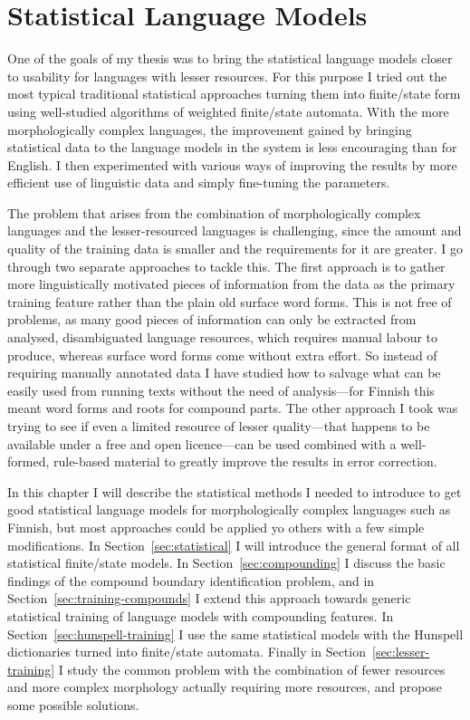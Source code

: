 \documentclass[officiallayout,final]{unihelcompling}
\begin{document}
\chapter{Statistical Language Models}
\label{chap:statistical-models}

One of the goals of my thesis was to bring the statistical \glspl{language
model} closer to usability for  languages with lesser resources. For this
purpose I tried out the most typical traditional statistical approaches turning
them into finite\-/state form using well-studied algorithms of weighted
finite\-/state automata. With the more morphologically complex languages, the
improvement gained by bringing statistical data to the language models in the
system is less encouraging than for English. I then experimented with various
ways of improving the results by more efficient use of linguistic data and
simply fine-tuning the parameters.

The problem that arises from the combination of morphologically complex
languages and the lesser-resourced languages is challenging, since the amount
and quality of the training data is smaller and the requirements for it are
greater. I go through two separate approaches to tackle this. The first
approach is to gather more linguistically motivated pieces of information from
the data as the primary training feature rather than the plain old surface
word forms. This is not free of problems, as many good pieces of information
can only be extracted from analysed, disambiguated language resources,
which requires manual labour to produce, whereas surface word forms
come without extra effort. So instead of requiring manually annotated data I
have studied how to salvage what can be easily used from running texts without
the need of analysis---for Finnish this meant word forms and roots for compound
parts. The other approach I took was trying to see if even a limited
resource of lesser quality---that happens to be available under a free and open
licence---can be used combined with a well-formed, rule-based material to
greatly improve the results in error correction.

In this chapter I will describe the statistical methods I needed to introduce
to get good statistical language models for morphologically complex languages
such as Finnish, but most approaches could be applied yo others with a
few simple modifications. In Section~\ref{sec:statistical} I will introduce the
general format of all statistical finite\-/state models.  In
Section~\ref{sec:compounding} I discuss the basic findings of the compound boundary
identification problem, and in Section~\ref{sec:training-compounds} I extend
this approach towards generic statistical training of language models with
compounding features. In Section~\ref{sec:hunspell-training} I use the same
statistical models with the Hunspell dictionaries turned into finite\-/state
automata. Finally in Section~\ref{sec:lesser-training} I study the common
problem with the combination of fewer resources and more complex morphology
actually requiring more resources, and propose some possible solutions.
\end{document}
